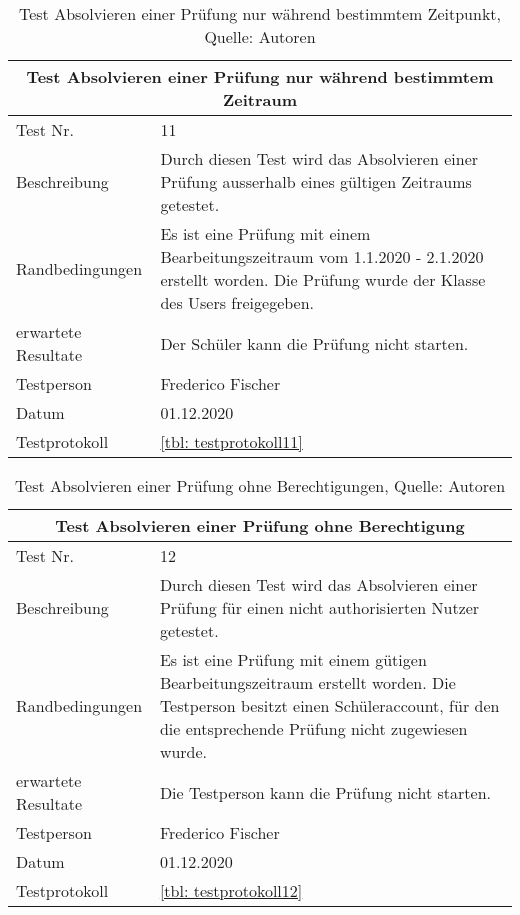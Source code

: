 \begin{table}[H]
\begin{tabularx}{\textwidth}{lX}
  \hline
  \multicolumn{2}{|c|}{Test Absolvieren einer Prüfung nur während bestimmtem Zeitraum} \\
  \hline
  Test Nr. & 11\\
  Beschreibung & Durch diesen Test wird das Absolvieren einer Prüfung ausserhalb eines gültigen Zeitraums getestet. \\
  Randbedingungen & Es ist eine Prüfung mit einem Bearbeitungszeitraum vom 1.1.2020 - 2.1.2020 erstellt worden. Die Prüfung wurde der Klasse des Users freigegeben.  \\
  erwartete Resultate & Der Schüler kann die Prüfung nicht starten.  \\
  Testperson & Frederico Fischer \\
  Datum & 01.12.2020 \\
  Testprotokoll & \ref{tbl: testprotokoll11}\\
   \hline
\end{tabularx}
\caption{ \label{tbl: Test Absolvieren einer Pruefung nur waehrend bestimmtem Zeitpunkt}Test Absolvieren einer Prüfung nur während bestimmtem Zeitpunkt, Quelle: Autoren}
\end{table}

\begin{table}[H]
\begin{tabularx}{\textwidth}{lX}
  \hline
  \multicolumn{2}{|c|}{Test Absolvieren einer Prüfung ohne Berechtigung} \\
  \hline
  Test Nr. & 12\\
  Beschreibung & Durch diesen Test wird das Absolvieren einer Prüfung für einen nicht authorisierten Nutzer getestet.  \\
  Randbedingungen & Es ist eine Prüfung mit einem gütigen Bearbeitungszeitraum erstellt worden. Die Testperson besitzt einen Schüleraccount, für den die entsprechende Prüfung nicht zugewiesen wurde.  \\
  erwartete Resultate & Die Testperson kann die Prüfung nicht starten.  \\
  Testperson & Frederico Fischer \\
  Datum & 01.12.2020 \\
  Testprotokoll & \ref{tbl: testprotokoll12}\\
   \hline
\end{tabularx}
\caption{ \label{tbl: Test Absolvieren einer Pruefung ohne Berechtigungen}Test Absolvieren einer Prüfung ohne Berechtigungen, Quelle: Autoren}
\end{table}

